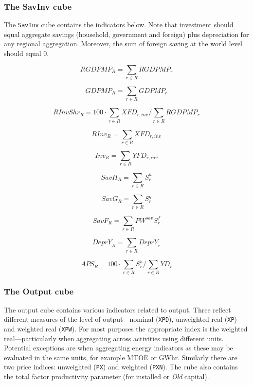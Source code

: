 \subsubsection{The SavInv cube}

The \texttt{SavInv} cube contains the indicators below. Note that
investment should equal aggregate savings (household, government and foreign)
plus depreciation for any regional aggregation. Moreover, the sum of
foreign saving at the world level should equal 0.

\[
\mathit{RGDPMP}_R = \sum_{r \in R} {\mathit{RGDPMP}_r}
\]

\[
\mathit{GDPMP}_R = \sum_{r \in R} {\mathit{GDPMP}_r}
\]

\[
\mathit{RInvShr}_{R} = 100 \cdot \sum_{r \in R} {\mathit{XFD}_{r,\mathit{inv}}} \bigg/ \sum_{r \in R} {\mathit{RGDPMP}_{r}}
\]

\[
\mathit{RInv}_{R} = \sum_{r \in R} {\mathit{XFD}_{r,\mathit{inv}}}
\]

\[
\mathit{Inv}_{R} = \sum_{r \in R} {\mathit{YFD}_{r,\mathit{inv}}}
\]

\[
\mathit{SavH}_{R} = \sum_{r \in R} {\mathit{S}^h_{r}}
\]

\[
\mathit{SavG}_{R} = \sum_{r \in R} {\mathit{S}^g_{r}}
\]

\[
\mathit{SavF}_{R} = \sum_{r \in R} {\mathit{PW}^{\mathit{sav}}\mathit{S}^f_{r}}
\]

\[
\mathit{DeprY}_{R} = \sum_{r \in R} {\mathit{DeprY}_{r}}
\]

\[
\mathit{APS}_{R} = 100 \cdot \sum_{r \in R} {\mathit{S}^h_{r}}  \bigg/ \sum_{r \in R} {\mathit{YD}_{r}}
\]

\subsubsection{The Output cube}
The output cube contains various indicators related to output. Three
reflect different measures of the level of output---nominal (\texttt{XPD}),
unweighted real (\texttt{XP}) and weighted real (\texttt{XPW}).
For most purposes the appropriate index is the weighted real---particularly
when aggregating across activities using different units. Potential
exceptions are when aggregating energy indicators as these may be
evaluated in the same units, for example MTOE or GWhr.
Similarly there
are two price indices: unweighted (\texttt{PX}) and weighted  (\texttt{PXN}).
The cube also contains the total factor productivity parameter (for installed
or \emph{Old} capital).

